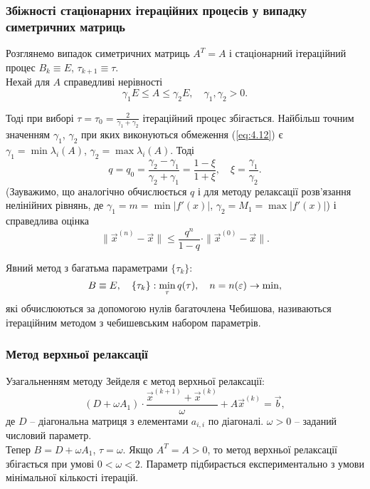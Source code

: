 \subsubsection{Збіжності стаціонарних ітераційних процесів у випадку симетричних матриць}

Розглянемо випадок симетричних матриць $A^T=A$ і стаціонарний ітераційний процес $B_k \equiv E$, $\tau_{k+1} \equiv \tau$. \\

Нехай для $A$ справедливі нерівності
\begin{equation}
	\label{eq:4.12}
	\gamma_1 E \le A \le \gamma_2 E, \quad \gamma_1, \gamma_2 > 0.
\end{equation}

Тоді при виборі $\tau = \tau_0 = \frac{2}{\gamma_1 + \gamma_2}$ ітераційний процес збігається. Найбільш точним значенням $\gamma_1$, $\gamma_2$ при яких виконуються обмеження (\ref{eq:4.12}) є $\gamma_1 = \min \lambda_i(A)$, $\gamma_2 = \max \lambda_i(A)$. Тоді 
\[q = q_0 = \dfrac{\gamma_2 - \gamma_1}{\gamma_2 + \gamma_1} = \dfrac{1-\xi}{1+\xi}, \quad \xi = \dfrac{\gamma_1}{\gamma_2}.\]
(Зауважимо, що аналогічно обчислюється $q$ і для методу релаксації розв'язання нелінійних рівнянь, де $\gamma_1 = m = \min |f'(x)|$, $\gamma_2 = M_1 = \max|f'(x)|$) і справедлива оцінка\[ \|\vec x^{(n)} - \vec x\| \le \dfrac{q^n}{1-q} \cdot \|\vec x^{(0)} - \vec x\|. \]

Явний метод з багатьма параметрами $\{\tau_k\}$:
\[ B \equiv E, \quad \{\tau_k\}: \displaystyle\min\limits_\tau q(\tau), \quad n=n(\varepsilon)\to\min,\]
які обчислюються за допомогою нулів багаточлена Чебишова, називаються ітераційним методом з чебишевським набором параметрів.

\subsubsection{Метод верхньої релаксації}

Узагальненням методу Зейделя є метод верхньої релаксації: \[ (D + \omega A_1) \cdot\dfrac{\vec x^{(k+1)} + \vec x^{(k)}}{\omega} + A \vec x^{(k)} = \vec b,\]
де $D$ -- діагональна матриця з елементами $a_{i,i}$ по діагоналі. $\omega > 0$ -- заданий числовий параметр. \\

Тепер $B = D + \omega A_1$, $\tau = \omega$. Якщо $A^T = A > 0$, то метод верхньої релаксації збігається при умові $0 < \omega < 2$. Параметр підбирається експериментально з умови мінімальної кількості ітерацій. 

